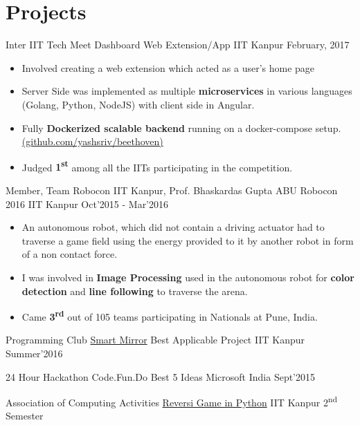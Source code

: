 \section*{\sc Projects}
\vspace{-2mm}
\hrulefill
\vspace{.2cm}

\cventry
{Inter IIT Tech Meet}
{Dashboard Web Extension/App}
{IIT Kanpur}
{February, 2017}
{
  \begin{itemize}
  \item Involved creating a web extension which acted as a user’s home page
  \item Server Side was implemented as multiple \textbf{microservices} in
    various languages (Golang, Python, NodeJS) with client side in Angular.
  \item Fully \textbf{Dockerized scalable backend} running on a docker-compose
    setup. \\
    \href{https://github.com/yashsriv/beethoven}{(github.com/yashsriv/beethoven)}
  \item Judged \textbf{1\textsuperscript{st}} among all the IITs participating
    in the competition.
  \end{itemize}
}

\cventry
{Member, Team Robocon IIT Kanpur, Prof. Bhaskardas Gupta}
{ABU Robocon 2016}
{IIT Kanpur}
{Oct'2015 - Mar'2016}
{
  \begin{itemize}
  \item An autonomous robot, which did not contain a driving actuator had to
    traverse a game field using the energy provided to it by another robot in
    form of a non contact force.
  \item I was involved in \textbf{Image Processing} used in the autonomous
    robot for \textbf{color detection} and \textbf{line following} to
    traverse the arena.
  \item Came \textbf{3\textsuperscript{rd}} out of 105 teams participating in Nationals at Pune, India.
  \end{itemize}
}

\smallcventry
{Programming Club}
{\href{http://pclub.in/project/2016/07/06/smartmirror.html}{Smart Mirror}}
{Best Applicable Project}
{IIT Kanpur}
{Summer'2016}

\smallcventry
{24 Hour Hackathon}
{Code.Fun.Do}
{Best 5 Ideas}
{Microsoft India}
{Sept'2015}

\smallcventry
{Association of Computing Activities}
{\href{http://github.com/yashsriv/Reversi-Python}{Reversi Game in Python}}
{}
{IIT Kanpur}
{2\textsuperscript{nd} Semester}
